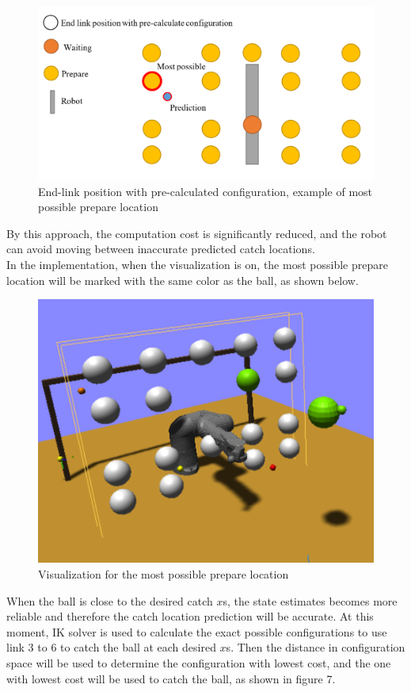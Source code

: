 \documentclass[a4paper]{article}
\begin{document}
\begin{figure}[!htbp]
\centering
\includegraphics[scale=0.7]{pre_caled.PNG}
\caption{End-link position with pre-calculated configuration, example of most possible prepare location}
\end{figure}
By this approach, the computation cost is significantly reduced, and the robot can avoid moving between inaccurate predicted catch locations. 
\\In the implementation, when the visualization is on, the most possible prepare location will be marked with the same color as the ball, as shown below.
\begin{figure}[h]
\centering
\includegraphics[scale=0.75]{closeImplementation.PNG}
\caption{Visualization for the most possible prepare location }
\end{figure} 
When the ball is close to the desired catch $x$s, the state estimates becomes more reliable and therefore the catch location prediction will be accurate. At this moment, IK solver is used to calculate the exact possible configurations to use link 3 to 6 to catch the ball at each desired $x$s. Then the distance in configuration space will be used to determine the configuration with lowest cost, and the one with lowest cost will be used to catch the ball, as shown in figure 7.
\end{document}
